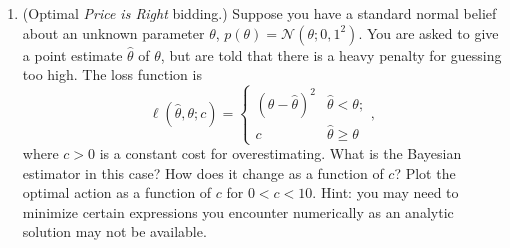\documentclass{article}
\newcommand{\mc}[1]{\mathcal{#1}}
\begin{document}
\begin{enumerate}
  (a) A uniform prior on $\theta$, which can be realized by selecting
  the beta distribution with $\alpha = \beta = 1$:
  \[
    p(\theta) = \mathcal{B}(\theta; \alpha = 1, \beta = 1).
  \]

  (b) A prior with extreme bias toward small values of $\theta$:
  \[
    p(\theta) = \mathcal{B}(\theta; \alpha = 1, \beta = 100).
  \]

  (c) A prior that has no support on values greater than $\theta =
  \nicefrac{1}{2}$:
  \[
    p(\theta) = \begin{cases} 2 & \theta <    \nicefrac{1}{2}; \\
                              0 & \theta \geq \nicefrac{1}{2}. \end{cases}
  \]

\item
  (Optimal \emph{Price is Right} bidding.)
  Suppose you have a standard normal belief about an unknown parameter
  $\theta$, $p(\theta) = \mc{N}(\theta; 0, 1^2)$.  You are asked to
  give a point estimate $\hat{\theta}$ of $\theta$, but are told that
  there is a heavy penalty for guessing too high.  The loss function is
  \begin{equation*}
    \ell(\hat{\theta}, \theta; c)
    =
    \begin{cases}
      (\theta - \hat{\theta})^2 & \hat{\theta}  <   \theta; \\
      c                         & \hat{\theta} \geq \theta
    \end{cases},
  \end{equation*}
  where $c > 0$ is a constant cost for overestimating.  What is the
  Bayesian estimator in this case?  How does it change as a function
  of $c$? Plot the optimal action as a function of $c$ for $0 < c <
  10$. Hint: you may need to minimize certain expressions you
  encounter numerically as an analytic solution may not be available.

\end{enumerate}
\end{document}
